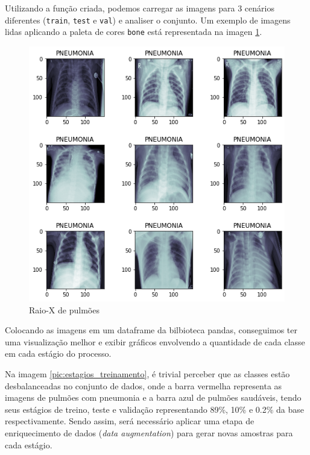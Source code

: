 Utilizando a função criada, podemos carregar as imagens para 3 cenários diferentes (\verb|train|, \verb|test| e \verb|val|) e analiser o conjunto. Um exemplo de imagens lidas aplicando a paleta de cores \verb|bone| está representada na imagen \ref{pic:3x3_raiox}.

\begin{figure}[!ht]
    \begin{center}
    \includegraphics[width=350pt]{pictures/images_chest.png}
    \caption{Raio-X de pulmões}
    \label{pic:3x3_raiox}
    \end{center}
\end{figure}

Colocando as imagens em um dataframe da bilbioteca pandas, conseguimos ter uma visualização melhor e exibir gráficos envolvendo a quantidade de cada classe em cada estágio do processo. 

Na imagem \ref{pic:estagios_treinamento}, é trivial perceber que as classes  estão desbalanceadas no conjunto de dados, onde a barra vermelha representa as imagens de pulmões com pneumonia e a barra azul de pulmões saudáveis, tendo seus estágios de treino, teste e validação representando 89\%, 10\% e  0.2\% da base respectivamente. Sendo assim, será necessário aplicar uma etapa de enriquecimento de dados (\textit{data augmentation}) para gerar novas amostras para cada estágio.

